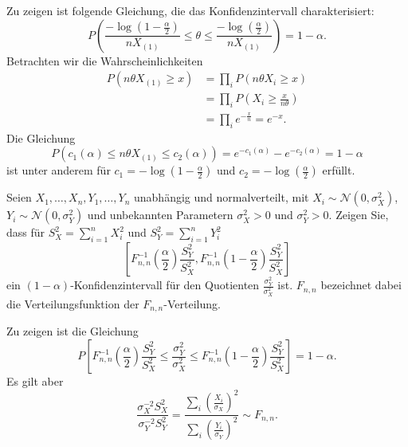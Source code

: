 \solution Zu zeigen ist folgende Gleichung, die das 
Konfidenzintervall charakterisiert:
\begin{equation*}
    P\left(   \frac{- \log \left( 1 - \frac{\alpha}{2} \right)}{n X_{(1)}} \leq \theta \leq 
    \frac{- \log \left( \frac{\alpha}{2} \right)}{n X_{(1)}} \right) = 1-\alpha.
\end{equation*}
Betrachten wir die Wahrscheinlichkeiten
\begin{align*}
    P \left( n\theta X_{(1)}\geq x \right) &=  \prod_i P \left( n\theta X_i \geq x \right) \\
    &= \prod_i P\left( X_i \geq \frac{x}{n\theta} \right) \\
    &= \prod_i e^{-\frac{x}{n}} = e^{-x}.
\end{align*}
Die Gleichung
\begin{equation*}
    P \left( c_1(\alpha) \leq n\theta X_{(1)} \leq c_2(\alpha) \right) = 
    e^{-c_1(\alpha)} - e^{-c_2(\alpha)} = 1-\alpha
\end{equation*}
ist unter anderem für $c_1 = -\log \left( 1-\frac{\alpha}{2} \right)$ und
$c_2 = -\log \left( \frac{\alpha}{2} \right)$ erfüllt.





Seien $X_1,\ldots,X_n,Y_1,\ldots,Y_n$ unabhängig und normalverteilt, mit 
$X_i \sim \mathcal N(0, \sigma^2_X)$, $Y_i \sim \mathcal N(0, \sigma^2_Y)$
und unbekannten Parametern $\sigma^2_X>0$ und $\sigma^2_Y>0$. 
Zeigen Sie, dass für $S^2_X = \sum_{i=1}^{n} X_i^2$ und $S^2_Y = \sum_{i=1}^{n} Y_i^2$
\begin{equation*}
    \left[ F^{-1}_{n,n} \left( \frac{\alpha}{2} \right) \frac{S_Y^2}{S_X^2},
    F^{-1}_{n,n} \left( 1 - \frac{\alpha}{2}  \right) \frac{S_Y^2}{S_X^2}     \right]
\end{equation*}
ein $(1-\alpha)$-Konfidenzintervall für den Quotienten $\frac{\sigma^2_Y}{\sigma^2_X}$ ist.
$F_{n,n}$ bezeichnet dabei die Verteilungsfunktion der $F_{n,n}$-Verteilung.

\solution Zu zeigen ist die Gleichung
\begin{equation*}
    P \left[ F^{-1}_{n,n} \left( \frac{\alpha}{2} \right) \frac{S_Y^2}{S_X^2} \leq 
    \frac{\sigma^2_Y}{\sigma^2_X} \leq
    F^{-1}_{n,n} \left( 1 - \frac{\alpha}{2}  \right) \frac{S_Y^2}{S_X^2}     \right]
    = 1-\alpha.
\end{equation*}
Es gilt aber 
\begin{equation*}
    \frac{\sigma^{-2}_X S^2_X  }{ \sigma^{-2}_Y S^2_Y} = 
    \frac{\sum_{i}^{} \left( \frac{X_i}{\sigma_X} \right)^2  }{ \sum_{i}^{} \left( \frac{Y_i}{\sigma_Y} \right)^2 } \sim F_{n,n}.
\end{equation*}







